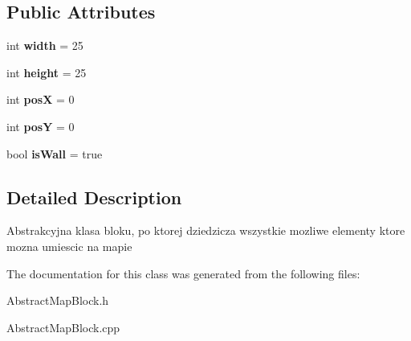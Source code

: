 \subsection*{Public Attributes}
\begin{DoxyCompactItemize}
\item 
\mbox{\label{class_abstract_map_block_afdfb3d8630fb089667c05daa27598ebb}} 
int {\bfseries width} = 25
\item 
\mbox{\label{class_abstract_map_block_ac20fe00ed32681d06378dd62e5901092}} 
int {\bfseries height} = 25
\item 
\mbox{\label{class_abstract_map_block_a5aa7d9d05727ac3b0f0f4746813d77e7}} 
int {\bfseries posX} = 0
\item 
\mbox{\label{class_abstract_map_block_a5e286fbe867af6c78c17e7e21f9948c4}} 
int {\bfseries posY} = 0
\item 
\mbox{\label{class_abstract_map_block_ae4151be3ea8a899aa9423e57262ef93e}} 
bool {\bfseries is\+Wall} = true
\end{DoxyCompactItemize}


\subsection{Detailed Description}
Abstrakcyjna klasa bloku, po ktorej dziedzicza wszystkie mozliwe elementy ktore mozna umiescic na mapie 

The documentation for this class was generated from the following files\+:\begin{DoxyCompactItemize}
\item 
Abstract\+Map\+Block.\+h\item 
Abstract\+Map\+Block.\+cpp\end{DoxyCompactItemize}
